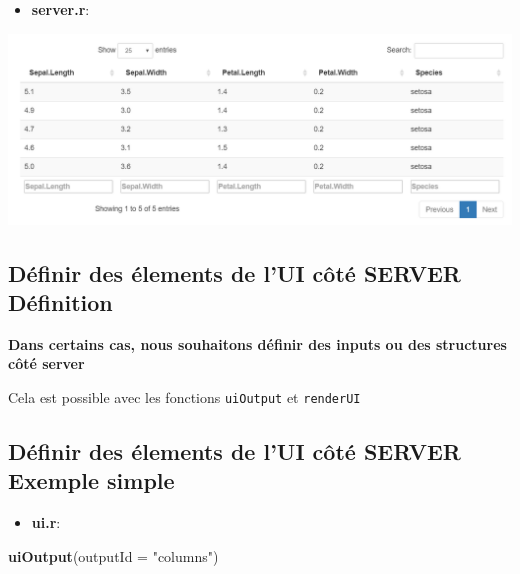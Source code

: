 \documentclass[]{article}
\newenvironment{Shaded}{\begin{snugshade}}{\end{snugshade}}
\newcommand{\KeywordTok}[1]{\textcolor[rgb]{0.13,0.29,0.53}{\textbf{#1}}}
\newcommand{\DataTypeTok}[1]{\textcolor[rgb]{0.13,0.29,0.53}{#1}}
\newcommand{\StringTok}[1]{\textcolor[rgb]{0.31,0.60,0.02}{#1}}
\newcommand{\OperatorTok}[1]{\textcolor[rgb]{0.81,0.36,0.00}{\textbf{#1}}}
\newcommand{\NormalTok}[1]{#1}
\providecommand{\tightlist}{%
  \setlength{\itemsep}{0pt}\setlength{\parskip}{0pt}}
\begin{document}
\begin{itemize}
\tightlist
\item
  \textbf{server.r}:
\end{itemize}

\begin{Shaded}
\end{Shaded}

\includegraphics{img/odatable.png}

\subsection{Définir des élements de l'UI côté SERVER \textbar{}
Définition}\label{definir-des-elements-de-lui-cote-server-definition}

\textbf{Dans certains cas, nous souhaitons définir des inputs ou des
structures côté server}

Cela est possible avec les fonctions \texttt{uiOutput} et
\texttt{renderUI}

\subsection{Définir des élements de l'UI côté SERVER \textbar{} Exemple
simple}\label{definir-des-elements-de-lui-cote-server-exemple-simple}

\begin{itemize}
\tightlist
\item
  \textbf{ui.r}:
\end{itemize}

\begin{Shaded}
\begin{Highlighting}[]
\KeywordTok{uiOutput}\NormalTok{(}\DataTypeTok{outputId =} \StringTok{"columns"}\NormalTok{)}
\end{Highlighting}
\end{Shaded}
\end{document}
